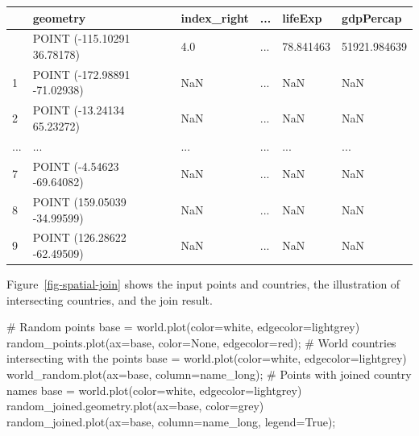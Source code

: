\documentclass[
  letterpaper,
]{krantz}
\newenvironment{Shaded}{\begin{snugshade}}{\end{snugshade}}
\newcommand{\CommentTok}[1]{\textcolor[rgb]{0.37,0.37,0.37}{#1}}
\newcommand{\NormalTok}[1]{\textcolor[rgb]{0.00,0.23,0.31}{#1}}
\newcommand{\OperatorTok}[1]{\textcolor[rgb]{0.37,0.37,0.37}{#1}}
\newcommand{\StringTok}[1]{\textcolor[rgb]{0.13,0.47,0.30}{#1}}
\newcommand{\VariableTok}[1]{\textcolor[rgb]{0.07,0.07,0.07}{#1}}
\begin{document}
\begin{longtable}[]{@{}llllll@{}}
\toprule\noalign{}
& geometry & index\_right & ... & lifeExp & gdpPercap \\
\midrule\noalign{}
\endhead
\bottomrule\noalign{}
\endlastfoot
0 & POINT (-115.10291 36.78178) & 4.0 & ... & 78.841463 &
51921.984639 \\
1 & POINT (-172.98891 -71.02938) & NaN & ... & NaN & NaN \\
2 & POINT (-13.24134 65.23272) & NaN & ... & NaN & NaN \\
... & ... & ... & ... & ... & ... \\
7 & POINT (-4.54623 -69.64082) & NaN & ... & NaN & NaN \\
8 & POINT (159.05039 -34.99599) & NaN & ... & NaN & NaN \\
9 & POINT (126.28622 -62.49509) & NaN & ... & NaN & NaN \\
\end{longtable}

Figure~\ref{fig-spatial-join} shows the input points and countries, the
illustration of intersecting countries, and the join result.

\begin{Shaded}
\begin{Highlighting}[]
\CommentTok{\# Random points}
\NormalTok{base }\OperatorTok{=}\NormalTok{ world.plot(color}\OperatorTok{=}\StringTok{\textquotesingle{}white\textquotesingle{}}\NormalTok{, edgecolor}\OperatorTok{=}\StringTok{\textquotesingle{}lightgrey\textquotesingle{}}\NormalTok{)}
\NormalTok{random\_points.plot(ax}\OperatorTok{=}\NormalTok{base, color}\OperatorTok{=}\StringTok{\textquotesingle{}None\textquotesingle{}}\NormalTok{, edgecolor}\OperatorTok{=}\StringTok{\textquotesingle{}red\textquotesingle{}}\NormalTok{)}\OperatorTok{;}
\CommentTok{\# World countries intersecting with the points}
\NormalTok{base }\OperatorTok{=}\NormalTok{ world.plot(color}\OperatorTok{=}\StringTok{\textquotesingle{}white\textquotesingle{}}\NormalTok{, edgecolor}\OperatorTok{=}\StringTok{\textquotesingle{}lightgrey\textquotesingle{}}\NormalTok{)}
\NormalTok{world\_random.plot(ax}\OperatorTok{=}\NormalTok{base, column}\OperatorTok{=}\StringTok{\textquotesingle{}name\_long\textquotesingle{}}\NormalTok{)}\OperatorTok{;}
\CommentTok{\# Points with joined country names}
\NormalTok{base }\OperatorTok{=}\NormalTok{ world.plot(color}\OperatorTok{=}\StringTok{\textquotesingle{}white\textquotesingle{}}\NormalTok{, edgecolor}\OperatorTok{=}\StringTok{\textquotesingle{}lightgrey\textquotesingle{}}\NormalTok{)}
\NormalTok{random\_joined.geometry.plot(ax}\OperatorTok{=}\NormalTok{base, color}\OperatorTok{=}\StringTok{\textquotesingle{}grey\textquotesingle{}}\NormalTok{)}
\NormalTok{random\_joined.plot(ax}\OperatorTok{=}\NormalTok{base, column}\OperatorTok{=}\StringTok{\textquotesingle{}name\_long\textquotesingle{}}\NormalTok{, legend}\OperatorTok{=}\VariableTok{True}\NormalTok{)}\OperatorTok{;}
\end{Highlighting}
\end{Shaded}
\end{document}
